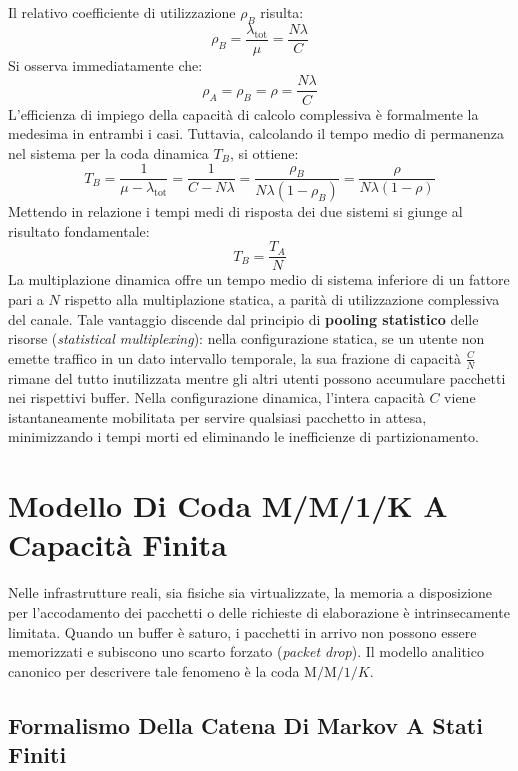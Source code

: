 \documentclass[11pt, a4paper]{article}
\begin{document}
Il relativo coefficiente di utilizzazione $\rho_B$ risulta:
\[
\rho_B = \frac{\lambda_{\text{tot}}}{\mu} = \frac{N \lambda}{C}
\]
Si osserva immediatamente che:
\[
\rho_A = \rho_B = \rho = \frac{N \lambda}{C}
\]
L'efficienza di impiego della capacità di calcolo complessiva è formalmente la medesima in entrambi i casi. Tuttavia, calcolando il tempo medio di permanenza nel sistema per la coda dinamica $T_B$, si ottiene:
\[
T_B = \frac{1}{\mu - \lambda_{\text{tot}}} = \frac{1}{C - N\lambda} = \frac{\rho_B}{N\lambda (1 - \rho_B)} = \frac{\rho}{N\lambda (1 - \rho)}
\]
Mettendo in relazione i tempi medi di risposta dei due sistemi si giunge al risultato fondamentale:
\[
\boxed{T_B = \frac{T_A}{N}}
\]
La multiplazione dinamica offre un tempo medio di sistema inferiore di un fattore pari a $N$ rispetto alla multiplazione statica, a parità di utilizzazione complessiva del canale. Tale vantaggio discende dal principio di \textbf{pooling statistico} delle risorse (\emph{statistical multiplexing}): nella configurazione statica, se un utente non emette traffico in un dato intervallo temporale, la sua frazione di capacità $\frac{C}{N}$ rimane del tutto inutilizzata mentre gli altri utenti possono accumulare pacchetti nei rispettivi buffer. Nella configurazione dinamica, l'intera capacità $C$ viene istantaneamente mobilitata per servire qualsiasi pacchetto in attesa, minimizzando i tempi morti ed eliminando le inefficienze di partizionamento.

\newpage

\section{Modello Di Coda M/M/1/K A Capacità Finita}

Nelle infrastrutture reali, sia fisiche sia virtualizzate, la memoria a disposizione per l'accodamento dei pacchetti o delle richieste di elaborazione è intrinsecamente limitata. Quando un buffer è saturo, i pacchetti in arrivo non possono essere memorizzati e subiscono uno scarto forzato (\emph{packet drop}). Il modello analitico canonico per descrivere tale fenomeno è la coda $\text{M/M/1/}K$.


\subsection{Formalismo Della Catena Di Markov A Stati Finiti}
\end{document}
